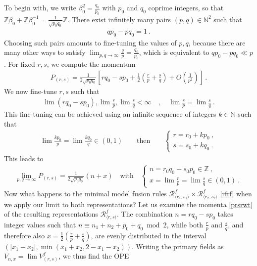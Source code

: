 \documentclass[12pt, a4paper]{article}
\begin{document}
To begin with, we write $\beta_0^2 = \frac{q_0}{p_0}$ with $p_0$ and $q_0$ coprime integers, so that $\mathbb{Z}\beta_0+\mathbb{Z}\beta_0^{-1}=\frac{1}{\sqrt{p_0q_0}}\mathbb{Z}$. There exist infinitely many pairs $(p,q)\in \mathbb{N}^2$ such that
\begin{align}
 qp_0-pq_0 = 1 \ .
\end{align}
Choosing such pairs amounts to fine-tuning the values of $p, q$, because there are many other ways to satisfy $\lim_{p,q\to\infty}\frac{q}{p}= \frac{q_0}{p_0}$, which is equivalent to $qp_0-pq_0 \ll p$. For fixed $r,s$, we compute the momentum
\begin{align}
 P_{(r,s)} = \frac{1}{2\sqrt{p_0q_0}}\left[rq_0-sp_0+ \frac12\left(\frac{r}{p}+\frac{s}{q}\right) + O\left(\frac{1}{p^2}\right)\right]\ . 
 \label{prsrwt}
\end{align}
We now fine-tune $r,s$ such that 
\begin{align}
 \lim(rq_0-sp_0), \lim\frac{r}{p} , \lim\frac{s}{q} <\infty \quad , \quad \lim\frac{r}{p} = \lim\frac{s}{q} \ . 
\end{align}
This fine-tuning can be achieved using an infinite sequence of integers $k\in\mathbb{N}$ such that
\begin{align}
\lim \frac{kp_0}{p} = \lim \frac{kq_0}{q}\in (0, 1) \qquad \text{then} \qquad
 \left\{\begin{array}{l} r = r_0 + k p_0\ , \\ s = s_0 + k q_0\ . \end{array}\right.
\end{align}
This leads to 
\begin{align}
 \lim_{p,q\to\infty} P_{(r,s)} = \frac{1}{2\sqrt{p_0q_0}}\left(n+x\right)\quad \text{with} \quad \left\{\begin{array}{l} n =r_0q_0 - s_0p_0 \in \mathbb{Z} \ , \\ x =  \lim\frac{r}{p} = \lim\frac{s}{q} \in (0, 1) \ . \end{array}\right.
\end{align}
Now what happens to the minimal model fusion rules $\mathcal{R}^f_{\langle r_1,s_1\rangle} \times \mathcal{R}^f_{\langle r_2,s_2\rangle}$ \eqref{rfrf} when we apply our limit to both representations? Let us examine the momenta \eqref{prsrwt} of the resulting representations $\mathcal{R}^f_{\langle r,s\rangle}$. The combination $n=rq_0-sp_0$ takes integer values such that $n\equiv n_1+n_2+p_0+q_0\bmod 2$, while
both $\frac{r}{p}$ and $\frac{s}{q}$, and therefore also $x=\frac12\left(\frac{r}{p}+\frac{s}{q}\right)$, are evenly distributed in the interval $(|x_1-x_2|, \min(x_1+x_2,2-x_1-x_2))$. Writing the primary fields as $V_{n,x} = \lim V_{(r,s)}^f$, we thus find the OPE
\end{document}
